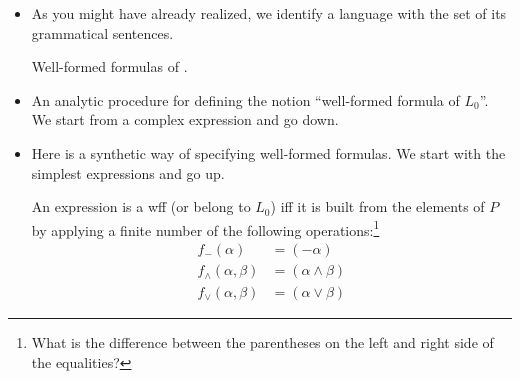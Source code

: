 \documentclass[11pt]{article}
\begin{document}
\begin{itemize}
\item As you might have already realized, we identify a language with the set of its grammatical sentences. 

\hrulefill
\begin{udefinition}{Well-formed formulas of .}
\end{udefinition}
\hrulefill

\item An analytic procedure for defining the notion ``well-formed formula of $L_0$''. We
start from a complex expression and go down.

\hrulefill
\begin{udefinition}
\end{udefinition}
\hrulefill



\item Here is a synthetic way of specifying well-formed formulas. We start with the
simplest expressions and go up.

\hrulefill
\begin{udefinition}[$L_0$, ``bottom-up'']\label{defbot}
An expression is a wff (or belong to $L_0$)
iff it is built from the
elements of $P$ by applying a finite number of the following
operations:\footnote{What is the difference between the parentheses on the left
and right side of the equalities?}
\begin{align}
f_-(\alpha) & = (-\alpha)\\
f_\land(\alpha,\beta) & = (\alpha\land\beta)\\
f_\lor(\alpha,\beta) & = (\alpha\lor\beta)
\end{align}
\end{udefinition}
\hrulefill



\end{itemize}
\end{document}
